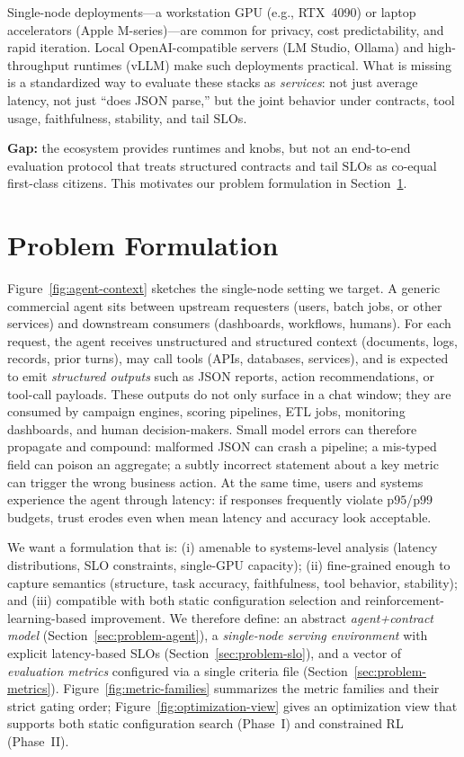 \documentclass[11pt]{article}
\newcommand{\pninetyfive}{\ensuremath{\mathrm{p95}}}
\newcommand{\pninetynine}{\ensuremath{\mathrm{p99}}}
\newcommand{\slo}{\ensuremath{\mathrm{SLO}}}
\begin{document}
Single-node deployments---a workstation GPU (e.g., RTX~4090) or laptop accelerators (Apple M-series)---are common for privacy, cost predictability, and rapid iteration.
Local OpenAI-compatible servers (LM Studio, Ollama) and high-throughput runtimes (vLLM) make such deployments practical.
What is missing is a standardized way to evaluate these stacks as \emph{services}: not just average latency, not just “does JSON parse,” but the joint behavior under contracts, tool usage, faithfulness, stability, and tail \slo s.

\textbf{Gap:} the ecosystem provides runtimes and knobs, but not an end-to-end evaluation protocol that treats structured contracts and tail \slo s as co-equal first-class citizens.
This motivates our problem formulation in Section~\ref{sec:problem}.

\section{Problem Formulation}
\label{sec:problem}

Figure~\ref{fig:agent-context} sketches the single-node setting we target.
A generic commercial agent sits between upstream requesters (users, batch jobs, or other services) and downstream consumers (dashboards, workflows, humans).
For each request, the agent receives unstructured and structured context (documents, logs, records, prior turns), may call tools (APIs, databases, services), and is expected to emit \emph{structured outputs} such as JSON reports, action recommendations, or tool-call payloads.
These outputs do not only surface in a chat window; they are consumed by campaign engines, scoring pipelines, ETL jobs, monitoring dashboards, and human decision-makers.
Small model errors can therefore propagate and compound:
malformed JSON can crash a pipeline;
a mis-typed field can poison an aggregate;
a subtly incorrect statement about a key metric can trigger the wrong business action.
At the same time, users and systems experience the agent through latency: if responses frequently violate \pninetyfive/\pninetynine budgets, trust erodes even when mean latency and accuracy look acceptable.

We want a formulation that is:
(i) amenable to systems-level analysis (latency distributions, SLO constraints, single-GPU capacity);
(ii) fine-grained enough to capture semantics (structure, task accuracy, faithfulness, tool behavior, stability);
and (iii) compatible with both static configuration selection and reinforcement-learning-based improvement.
We therefore define:
an abstract \emph{agent+contract model} (Section~\ref{sec:problem-agent}),
a \emph{single-node serving environment} with explicit latency-based SLOs (Section~\ref{sec:problem-slo}),
and a vector of \emph{evaluation metrics} configured via a single criteria file (Section~\ref{sec:problem-metrics}).
Figure~\ref{fig:metric-families} summarizes the metric families and their strict gating order; Figure~\ref{fig:optimization-view} gives an optimization view that supports both static configuration search (Phase~I) and constrained RL (Phase~II).
\end{document}
